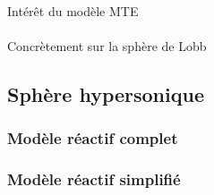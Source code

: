       \paragraph{}
      Intérêt du modèle MTE

      \paragraph{}
      Concrètement sur la sphère de Lobb


    \subsection{Sphère hypersonique}
      \subsubsection{Modèle réactif complet}
      \subsubsection{Modèle réactif simplifié}
